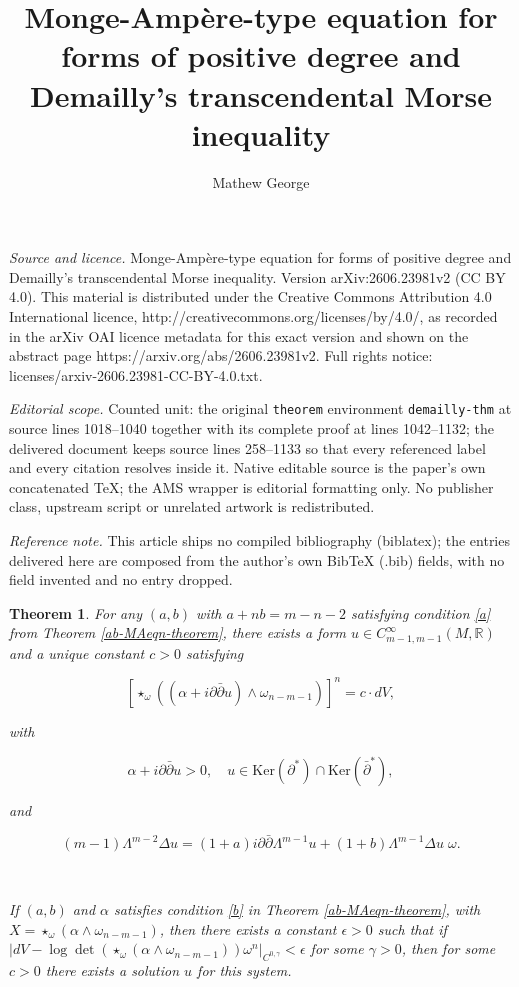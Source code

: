 \documentclass[10pt,a4paper]{amsart}
\newcommand{\spartial}{\partial^*}
\newcommand{\pbp}{\partial \bar{\partial}}
\newcommand{\Ker}{\mbox{Ker}}
\newtheorem{theorem}{Theorem}[section]
\numberwithin{equation}{section}
\begin{document}
\title[Monge-Amp`ere-type equation for forms of positive degree and]{Monge-Amp\`ere-type equation for forms of positive degree and Demailly's transcendental Morse inequality}
\author{Mathew George}
\date{}
\maketitle
\noindent\emph{Source and licence.} Monge-Amp\`ere-type equation for forms of positive degree and Demailly's transcendental Morse inequality. Version arXiv:2606.23981v2 (CC BY 4.0). This material is distributed under the Creative Commons Attribution 4.0 International licence, http://creativecommons.org/licenses/by/4.0/, as recorded in the arXiv OAI licence metadata for this exact version and shown on the abstract page https://arxiv.org/abs/2606.23981v2. Full rights notice: licenses/arxiv-2606.23981-CC-BY-4.0.txt.\par\smallskip
\noindent\textit{Editorial scope.} Counted unit: the original \texttt{theorem} environment \texttt{demailly-thm} at source lines 1018--1040 together with its complete proof at lines 1042--1132; the delivered document keeps source lines 258--1133 so that every referenced label and every citation resolves inside it. Native editable source is the paper's own concatenated TeX; the AMS wrapper is editorial formatting only. No publisher class, upstream script or unrelated artwork is redistributed.
\par\smallskip\noindent\textit{Reference note.} This article ships no compiled bibliography (biblatex); the entries delivered here are composed from the author's own BibTeX (.bib) fields, with no field invented and no entry dropped.
\begin{theorem}\label{exist-theorem}
  For any $(a,b)$ with $a+nb = m-n-2$ satisfying condition \ref{a} from Theorem \ref{ab-MAeqn-theorem}, there exists a form $u \in C^{\infty}_{m-1,m-1}(M, \mathbb R)$ and  a unique constant $c > 0$ satisfying

$$\left[\star_{\omega}\left((\alpha + i \pbp u)\wedge \omega_{n-m-1}\right)\right]^n = c \cdot dV,$$

\noindent with  

$$   \alpha + i \pbp u >0, \quad u \in \Ker (\spartial) \cap \Ker( \bar{\partial}^*),$$

\noindent and

$$ (m-1)\Lambda^{m-2} \Delta u = (1+a) i \pbp \Lambda^{m-1}  u +  (1+b) \Lambda^{m-1} \Delta u \;\omega.$$

\

If $(a,b)$ and $\alpha$ satisfies condition \ref{b} in Theorem \ref{ab-MAeqn-theorem}, with $X = \star_{\omega}(\alpha \wedge \omega_{n-m-1})$, then there exists a constant $\epsilon>0$ such that if $|dV - \log\det( \star_{\omega}(\alpha \wedge \omega_{n-m-1})) \omega^n|_{C^{0,\gamma}}< \epsilon$ for some $\gamma >0 $, then for some $c>0$ there exists a solution $u$ for this system.

\end{theorem}
\end{document}
